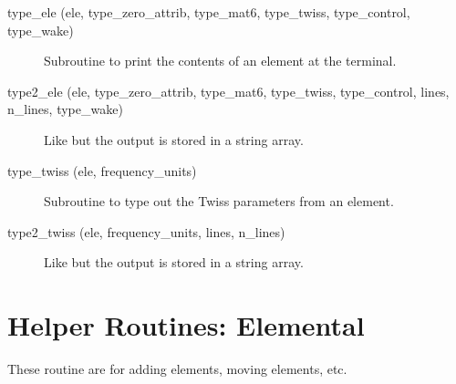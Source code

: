 \begin{description}
\item[type\_ele (ele, type\_zero\_attrib, type\_mat6, type\_twiss, 
type\_control, type\_wake)] \Newline
Subroutine to print the contents of an element at the terminal. 

\item[type2\_ele (ele, type\_zero\_attrib, type\_mat6, type\_twiss, 
type\_control, lines, n\_lines, type\_wake)] \Newline
Like  but the output is stored in a string array. 

\item[type\_twiss (ele, frequency\_units)] \Newline
Subroutine to type out the Twiss parameters from an element. 

\item[type2\_twiss (ele, frequency\_units, lines, n\_lines)] \Newline
Like  but the output is stored in a string array. 

\end{description}

\section{Helper Routines: Elemental}
\label{r:elem}     

These routine are for adding elements, moving elements, etc.

